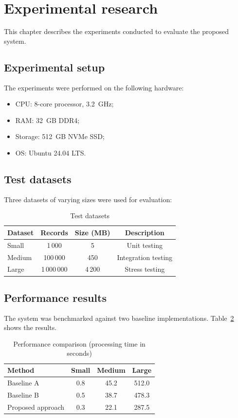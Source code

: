 \section{Experimental research}

This chapter describes the experiments conducted to evaluate the proposed system.

\subsection{Experimental setup}

The experiments were performed on the following hardware:
\begin{itemize}
  \item CPU: 8-core processor, 3.2~GHz;
  \item RAM: 32~GB DDR4;
  \item Storage: 512~GB NVMe SSD;
  \item OS: Ubuntu 24.04 LTS.
\end{itemize}

\subsection{Test datasets}

Three datasets of varying sizes were used for evaluation:

\begin{table}[H]
    \caption{Test datasets} \label{tab:datasets}
    \begin{tabular}{|l|c|c|c|}
    \hline \textbf{Dataset} & \textbf{Records} & \textbf{Size (MB)} & \textbf{Description} \\
    \hline Small   & 1\,000    & 5   & Unit testing \\
    \hline Medium  & 100\,000  & 450 & Integration testing \\
    \hline Large   & 1\,000\,000 & 4\,200 & Stress testing \\
    \hline
    \end{tabular}
\end{table}

\subsection{Performance results}

The system was benchmarked against two baseline implementations.
Table~\ref{tab:performance} shows the results.

\begin{table}[H]
    \caption{Performance comparison (processing time in seconds)} \label{tab:performance}
    \begin{tabular}{|l|c|c|c|}
    \hline \textbf{Method} & \textbf{Small} & \textbf{Medium} & \textbf{Large} \\
    \hline Baseline A       & 0.8  & 45.2  & 512.0 \\
    \hline Baseline B       & 0.5  & 38.7  & 478.3 \\
    \hline Proposed approach & 0.3  & 22.1  & 287.5 \\
    \hline
    \end{tabular}
\end{table}

